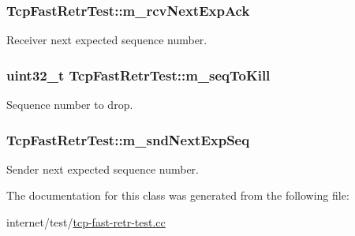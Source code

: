 \subsubsection[{\texorpdfstring{m\+\_\+rcv\+Next\+Exp\+Ack}{m_rcvNextExpAck}}]{ Tcp\+Fast\+Retr\+Test\+::m\+\_\+rcv\+Next\+Exp\+Ack\hspace{0.3cm}{\ttfamily [protected]}}\hypertarget{classTcpFastRetrTest_ab78190a49235a31ec165a895df9ddbaf}{}\label{classTcpFastRetrTest_ab78190a49235a31ec165a895df9ddbaf}


Receiver next expected sequence number. 

\subsubsection[{\texorpdfstring{m\+\_\+seq\+To\+Kill}{m_seqToKill}}]{\setlength{\rightskip}{0pt plus 5cm}uint32\+\_\+t Tcp\+Fast\+Retr\+Test\+::m\+\_\+seq\+To\+Kill\hspace{0.3cm}{\ttfamily [protected]}}\hypertarget{classTcpFastRetrTest_a3064a7c9176cf9822ad2c98fcfab9e7f}{}\label{classTcpFastRetrTest_a3064a7c9176cf9822ad2c98fcfab9e7f}


Sequence number to drop. 

\subsubsection[{\texorpdfstring{m\+\_\+snd\+Next\+Exp\+Seq}{m_sndNextExpSeq}}]{ Tcp\+Fast\+Retr\+Test\+::m\+\_\+snd\+Next\+Exp\+Seq\hspace{0.3cm}{\ttfamily [protected]}}\hypertarget{classTcpFastRetrTest_a39e5dc90efb03fa4e0743990e5d53c58}{}\label{classTcpFastRetrTest_a39e5dc90efb03fa4e0743990e5d53c58}


Sender next expected sequence number. 



The documentation for this class was generated from the following file\+:\begin{DoxyCompactItemize}
\item 
internet/test/\hyperlink{tcp-fast-retr-test_8cc}{tcp-\/fast-\/retr-\/test.\+cc}\end{DoxyCompactItemize}
